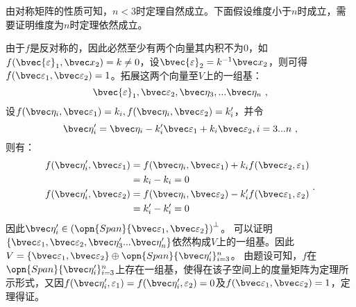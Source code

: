 由对称矩阵的性质可知，$n< 3$时定理自然成立。下面假设维度小于$n$时成立，需要证明维度为$n$时定理依然成立。

由于$f$是反对称的，因此必然至少有两个向量其内积不为$0$，如$f(\bvec {\varepsilon}_1,\bvec x_2)=k\neq 0$，设$\bvec {\varepsilon}_2=k^{-1}\bvec x_2$，则可得$f(\bvec\varepsilon_1,\bvec\varepsilon_2)=1$。拓展这两个向量至$V$上的一组基：
\begin{equation}
\bvec {\varepsilon}_1,\bvec \varepsilon_2,\bvec\eta_3,...\bvec\eta_n~,
\end{equation}
设$f(\bvec \eta_i,\bvec\varepsilon_1)=k_i,f(\bvec \eta_i,\bvec\varepsilon_2)=k'_i$，并令
\begin{equation}
\bvec\eta'_i=\bvec \eta_i-k'_i\bvec\varepsilon_1+k_i\bvec\varepsilon_2,i=3...n~,
\end{equation}
则有：
\begin{equation}
\begin{aligned}
f(\bvec \eta'_i,\bvec\varepsilon_1)&=f(\bvec\eta_i,\bvec\varepsilon_1)+k_if(\bvec\varepsilon_2,\varepsilon_1)\\
&=k_i-k_i=0\\
f(\bvec \eta'_i,\bvec\varepsilon_2)&=f(\bvec\eta_i,\bvec\varepsilon_2)-k'_if(\bvec\varepsilon_1,\varepsilon_2)\\
&=k'_i-k'_i=0
\end{aligned}~.
\end{equation}
因此$\bvec \eta'_i\in \left(\opn{Span}\{\bvec\varepsilon_1,\bvec\varepsilon_2\}\right)^{\bot}$。
可以证明$\{\bvec\varepsilon_1,\bvec\varepsilon_2,\bvec\eta'_3...\bvec\eta'_n\}$依然构成$V$上的一组基。因此$V=\{\bvec\varepsilon_1,\bvec\varepsilon_2\}\oplus \opn{Span}\{\bvec\eta'_i\}_{i=3}^n$。
由题设可知，$f$在$ \opn{Span}\{\bvec\eta'_i\}_{i=3}^n$上存在一组基，使得在该子空间上的度量矩阵为定理所示形式，又因$f(\bvec \eta'_i,\varepsilon_1)=f(\bvec \eta'_i,\varepsilon_2)=0$及$f(\bvec\varepsilon_1,
\bvec\varepsilon_2)=1$，定理得证。